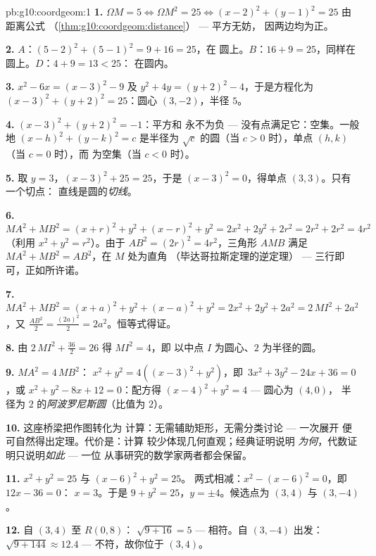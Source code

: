 \begin{solution}{pb:g10:coordgeom:1}
\textbf{1.} $\Omega M = 5 \iff \Omega M^2 = 25 \iff
(x - 2)^2 + (y - 1)^2 = 25$ 由距离公式
（\cref{thm:g10:coordgeom:distance}） --- 平方无妨，
因两边均为正。

\textbf{2.} $A$：$(5-2)^2 + (5-1)^2 = 9 + 16 = 25$，在
圆上。$B$：$16 + 9 = 25$，同样在圆上。$D$：$4 + 9 = 13 < 25$：
在圆内。

\textbf{3.} $x^2 - 6x = (x - 3)^2 - 9$ 及
$y^2 + 4y = (y + 2)^2 - 4$，于是方程化为
$(x - 3)^2 + (y + 2)^2 = 25$：圆心 $(3, -2)$，半径 $5$。

\textbf{4.} $(x - 3)^2 + (y + 2)^2 = -1$：平方和
永不为负 --- 没有点满足它：空集。一般地
$(x - h)^2 + (y - k)^2 = c$ 是半径为
$\sqrt c$ 的圆（当 $c > 0$ 时），单点 $(h, k)$（当 $c = 0$ 时），而
为空集（当 $c < 0$ 时）。

\textbf{5.} 取 $y = 3$，$(x - 3)^2 + 25 = 25$，于是
$(x - 3)^2 = 0$，得单点 $(3, 3)$。只有一个切点：
直线是圆的\emph{切线}。

\textbf{6.} $MA^2 + MB^2 = (x + r)^2 + y^2 + (x - r)^2 + y^2
= 2x^2 + 2y^2 + 2r^2 = 2r^2 + 2r^2 = 4r^2$（利用
$x^2 + y^2 = r^2$）。由于 $AB^2 = (2r)^2 = 4r^2$，三角形
$AMB$ 满足 $MA^2 + MB^2 = AB^2$，在 $M$ 处为直角
（毕达哥拉斯定理的逆定理） --- 三行即可，正如所许诺。

\textbf{7.} $MA^2 + MB^2 = (x + a)^2 + y^2 + (x - a)^2 + y^2
= 2x^2 + 2y^2 + 2a^2 = 2\,MI^2 + 2a^2$，又
$\frac{AB^2}{2} = \frac{(2a)^2}{2} = 2a^2$。恒等式得证。

\textbf{8.} 由 $2\,MI^2 + \frac{36}{2} = 26$ 得 $MI^2 = 4$，即
以中点 $I$ 为圆心、$2$ 为半径的圆。

\textbf{9.} $MA^2 = 4\,MB^2$：
$x^2 + y^2 = 4\left((x - 3)^2 + y^2\right)$，即\
$3x^2 + 3y^2 - 24x + 36 = 0$，或
$x^2 + y^2 - 8x + 12 = 0$：配方得
$(x - 4)^2 + y^2 = 4$ --- 圆心为 $(4, 0)$，
半径为 $2$ 的\emph{阿波罗尼斯圆}（比值为 $2$）。

\textbf{10.} 这座桥梁把作图转化为
计算：无需辅助矩形，无需分类讨论 --- 一次展开
便可自然得出定理。代价是：计算
较少体现几何直观；经典证明说明
\emph{为何}，代数证明只说明\emph{如此} --- 一位
从事研究的数学家两者都会保留。

\textbf{11.} $x^2 + y^2 = 25$ 与 $(x - 6)^2 + y^2 = 25$。
两式相减：$x^2 - (x - 6)^2 = 0$，即\ $12x - 36 = 0$：
$x = 3$。于是 $9 + y^2 = 25$，$y = \pm 4$。候选点为
$(3, 4)$ 与 $(3, -4)$。

\textbf{12.} 自 $(3, 4)$ 至 $R(0, 8)$：
$\sqrt{9 + 16} = 5$ --- 相符。自 $(3, -4)$ 出发：
$\sqrt{9 + 144} \approx 12.4$ --- 不符，故你位于 $(3, 4)$。


\end{solution}
